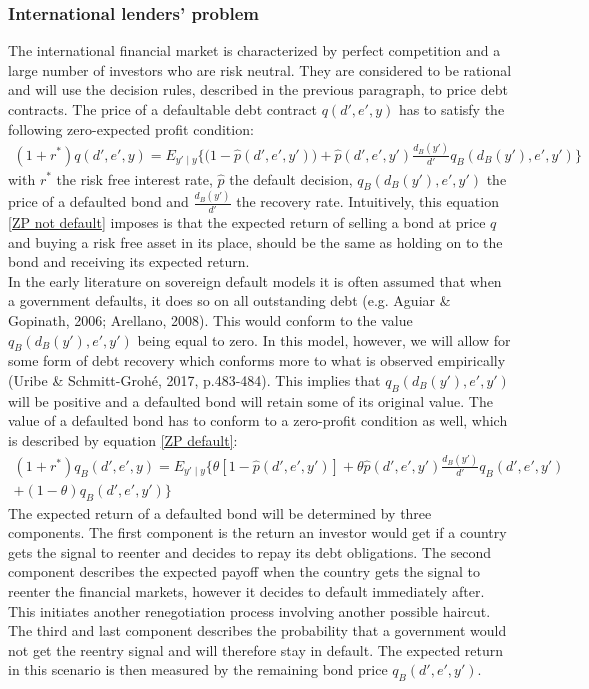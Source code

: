 \subsubsection{International lenders' problem}
The international financial market is characterized by perfect competition and a large number of investors who are risk neutral. They are considered to be rational and will use the decision rules, described in the previous paragraph, to price debt contracts. The price of a defaultable debt contract $q(d',e',y)$ has to satisfy the following zero-expected profit condition:
\begin{equation}\label{ZP not default}
\begin{split}
        (1+r^*)q(d',e',y) = E_{y'\mid y}\bigg\{(1-\hat{p}(d',e',y')\big) + \hat{p}(d',e',y')\frac{d_B(y')}{d'}q_B(d_{B}(y'),e',y')\bigg\}
\end{split}
\end{equation}
with $r^*$ the risk free interest rate, $\hat{p}$ the default decision, $q_B(d_B(y'),e',y')$ the price of a defaulted bond and $\frac{d_B(y')}{d'}$ the recovery rate. Intuitively, this equation \eqref{ZP not default} imposes is that the expected return of selling a bond at price $q$ and buying a risk free asset in its place, should be the same as holding on to the bond and receiving its expected return.\\

In the early literature on sovereign default models it is often assumed that when a government defaults, it does so on all outstanding debt (e.g. Aguiar \& Gopinath, 2006; Arellano, 2008). This would conform to the value $q_B(d_{B}(y'),e',y')$ being equal to zero. In this model, however, we will allow for some form of debt recovery which conforms more to what is observed empirically (Uribe \& Schmitt-Grohé, 2017, p.483-484). This implies that $q_B(d_{B}(y'),e',y')$ will be positive and a defaulted bond will retain some of its original value. The value of a defaulted bond has to conform to a zero-profit condition as well, which is described by equation \eqref{ZP default}:\\
\begin{equation}
\label{ZP default}
\begin{split}
    (1+r^*)q_B(d',e',y) =  E_{y'\mid y}\bigg\{\theta[1-\hat{p}(d',e',y')] + \theta\hat{p}(d',e',y')\frac{d_B(y')}{d'}q_B(d',e',y') \\ + (1-\theta)q_B(d',e',y')\bigg\}
   \end{split}
\end{equation}
\clearpage
The expected return of a defaulted bond will be determined by three components. The first component is the return an investor would get if a country gets the signal to reenter and decides to repay its debt obligations. The second component describes the expected payoff when the country gets the signal to reenter the financial markets, however it decides to default immediately after. This initiates another renegotiation process involving another possible haircut. The third and last component describes the probability that a government would not get the reentry signal and will therefore stay in default. The expected return in this scenario is then measured by the remaining bond price $q_B(d',e',y')$.\\
